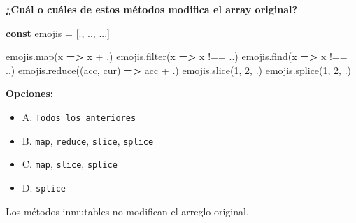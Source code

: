 \documentclass[
  letterpaper,
  DIV=11,
  numbers=noendperiod]{scrreprt}
\newenvironment{Shaded}{\begin{snugshade}}{\end{snugshade}}
\newcommand{\DecValTok}[1]{\textcolor[rgb]{0.68,0.00,0.00}{#1}}
\newcommand{\FunctionTok}[1]{\textcolor[rgb]{0.28,0.35,0.67}{#1}}
\newcommand{\KeywordTok}[1]{\textcolor[rgb]{0.00,0.23,0.31}{\textbf{#1}}}
\newcommand{\NormalTok}[1]{\textcolor[rgb]{0.00,0.23,0.31}{#1}}
\newcommand{\OperatorTok}[1]{\textcolor[rgb]{0.37,0.37,0.37}{#1}}
\newcommand{\StringTok}[1]{\textcolor[rgb]{0.13,0.47,0.30}{#1}}
\providecommand{\tightlist}{%
  \setlength{\itemsep}{0pt}\setlength{\parskip}{0pt}}
\begin{document}
\textbf{¿Cuál o cuáles de estos métodos modifica el array original?}

\begin{Shaded}
\begin{Highlighting}[]
\KeywordTok{const}\NormalTok{ emojis }\OperatorTok{=}\NormalTok{ [}\StringTok{\textquotesingle{}.\textquotesingle{}}\OperatorTok{,} \StringTok{\textquotesingle{}..\textquotesingle{}}\OperatorTok{,} \StringTok{\textquotesingle{}...\textquotesingle{}}\NormalTok{]}

\NormalTok{emojis}\OperatorTok{.}\FunctionTok{map}\NormalTok{(x }\KeywordTok{=\textgreater{}}\NormalTok{ x }\OperatorTok{+} \StringTok{\textquotesingle{}.\textquotesingle{}}\NormalTok{)}
\NormalTok{emojis}\OperatorTok{.}\FunctionTok{filter}\NormalTok{(x }\KeywordTok{=\textgreater{}}\NormalTok{ x }\OperatorTok{!==} \StringTok{\textquotesingle{}..\textquotesingle{}}\NormalTok{)}
\NormalTok{emojis}\OperatorTok{.}\FunctionTok{find}\NormalTok{(x }\KeywordTok{=\textgreater{}}\NormalTok{ x }\OperatorTok{!==} \StringTok{\textquotesingle{}..\textquotesingle{}}\NormalTok{)}
\NormalTok{emojis}\OperatorTok{.}\FunctionTok{reduce}\NormalTok{((acc}\OperatorTok{,}\NormalTok{ cur) }\KeywordTok{=\textgreater{}}\NormalTok{ acc }\OperatorTok{+} \StringTok{\textquotesingle{}.\textquotesingle{}}\NormalTok{)}
\NormalTok{emojis}\OperatorTok{.}\FunctionTok{slice}\NormalTok{(}\DecValTok{1}\OperatorTok{,} \DecValTok{2}\OperatorTok{,} \StringTok{\textquotesingle{}.\textquotesingle{}}\NormalTok{) }
\NormalTok{emojis}\OperatorTok{.}\FunctionTok{splice}\NormalTok{(}\DecValTok{1}\OperatorTok{,} \DecValTok{2}\OperatorTok{,} \StringTok{\textquotesingle{}.\textquotesingle{}}\NormalTok{)}
\end{Highlighting}
\end{Shaded}

\textbf{Opciones:}

\begin{itemize}
\tightlist
\item
  A. \texttt{Todos\ los\ anteriores}
\item
  B. \texttt{map}, \texttt{reduce}, \texttt{slice}, \texttt{splice}
\item
  C. \texttt{map}, \texttt{slice}, \texttt{splice}
\item
  D. \texttt{splice}
\end{itemize}

\begin{tcolorbox}[enhanced jigsaw, left=2mm, toprule=.15mm, leftrule=.75mm, breakable, colback=white, coltitle=black, bottomtitle=1mm, arc=.35mm, rightrule=.15mm, colframe=quarto-callout-tip-color-frame, opacitybacktitle=0.6, toptitle=1mm, opacityback=0, titlerule=0mm, title=\textcolor{quarto-callout-tip-color}{\faLightbulb}\hspace{0.5em}{Pista}, bottomrule=.15mm, colbacktitle=quarto-callout-tip-color!10!white]

Los métodos inmutables no modifican el arreglo original.

\end{tcolorbox}
\end{document}
